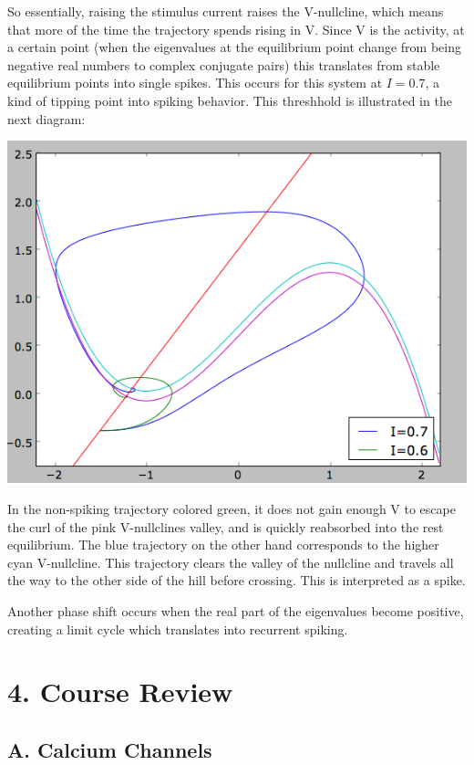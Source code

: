 \documentclass[12pt]{article}
\begin{document}
So essentially, raising the stimulus current raises the V-nullcline, which means that more of the time the trajectory spends rising in V.  Since V is the activity, at a certain point (when the eigenvalues at the equilibrium point change from being negative real numbers to complex conjugate pairs) this translates from stable equilibrium points into single spikes.  This occurs for this system at $I=0.7$, a kind of tipping point into spiking behavior.  This threshhold is illustrated in the next diagram:

\vspace{15pt}
\includegraphics[scale=0.71]{phaseplanethreshhold.png}
\vspace{5pt}

In the non-spiking trajectory colored green, it does not gain enough V to escape the curl of the pink V-nullclines valley, and is quickly reabsorbed into the rest equilibrium.  The blue trajectory on the other hand corresponds to the higher cyan V-nullcline.  This trajectory clears the valley of the nullcline and travels all the way to the other side of the hill before crossing.  This is interpreted as a spike.  

Another phase shift occurs when the real part of the eigenvalues become positive, creating a limit cycle which translates into recurrent spiking.  

\section{4. Course Review}

\subsection{A. Calcium Channels}
\end{document}

